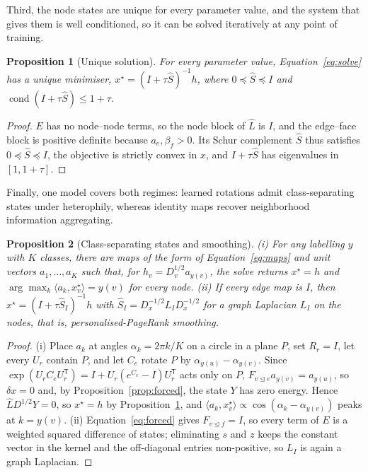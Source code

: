 \documentclass{article}
\newtheorem{proposition}{Proposition}
\newcommand{\transpose}{\mathsf{T}}
\newcommand{\inc}{\trianglelefteq}
\begin{document}
Third, the node states are unique for every parameter value, and the system that gives them is well conditioned, so it can be solved iteratively at any point of training.
\begin{proposition}[Unique solution]\label{prop:unique}
For every parameter value, Equation~\eqref{eq:solve} has a unique minimiser, $x^\star=(I+\tau\hat S)^{-1}h$, where $0\preceq\hat S\preceq I$ and $\operatorname{cond}(I+\tau\hat S)\le1+\tau$.
\end{proposition}
\begin{proof}
$E$ has no node--node terms, so the node block of $\hat L$ is $I$, and the edge--face block is positive definite because $a_e,\beta_f>0$. Its Schur complement $\hat S$ thus satisfies $0\preceq\hat S\preceq I$, the objective is strictly convex in $x$, and $I+\tau\hat S$ has eigenvalues in $[1,1+\tau]$.
\end{proof}

Finally, one model covers both regimes: learned rotations admit class-separating states under heterophily, whereas identity maps recover neighborhood information aggregating.
\begin{proposition}[Class-separating states and smoothing]\label{prop:separate}
(i) For any labelling $y$ with $K$ classes, there are maps of the form of Equation~\eqref{eq:maps} and unit vectors $a_1,\ldots,a_K$ such that, for $h_v=D_v^{1/2}a_{y(v)}$, the solve returns $x^\star=h$ and $\arg\max_k\langle a_k,x^\star_v\rangle=y(v)$ for every node. (ii) If every edge map is $I$, then $x^\star=(I+\tau\hat S_I)^{-1}h$ with $\hat S_I=D_x^{-1/2}L_ID_x^{-1/2}$ for a graph Laplacian $L_I$ on the nodes, that is, personalised-PageRank smoothing.
\end{proposition}
\begin{proof}
(i) Place $a_k$ at angles $\alpha_k=2\pi k/K$ on a circle in a plane $P$, set $R_r=I$, let every $U_r$ contain $P$, and let $C_e$ rotate $P$ by $\alpha_{y(u)}-\alpha_{y(v)}$. Since $\exp(U_rC_eU_r^{\transpose})=I+U_r(e^{C_e}-I)U_r^{\transpose}$ acts only on $P$, $F_{v\inc e}a_{y(v)}=a_{y(u)}$, so $\delta x=0$ and, by Proposition~\ref{prop:forced}, the state $Y$ has zero energy. Hence $\hat LD^{1/2}Y=0$, so $x^\star=h$ by Proposition~\ref{prop:unique}, and $\langle a_k,x^\star_v\rangle\propto\cos(\alpha_k-\alpha_{y(v)})$ peaks at $k=y(v)$. (ii) Equation~\eqref{eq:forced} gives $F_{v\inc f}=I$, so every term of $E$ is a weighted squared difference of states; eliminating $s$ and $z$ keeps the constant vector in the kernel and the off-diagonal entries non-positive, so $L_I$ is again a graph Laplacian.
\end{proof}
\end{document}
